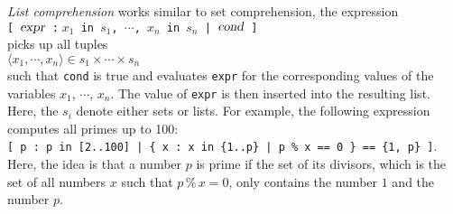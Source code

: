 \emph{List comprehension} works similar to set comprehension, the expression
\\[0.2cm]
\hspace*{1.3cm}
\texttt{[ $\textsl{expr}$ :$\;x_1$ in $s_1$, $\cdots$, $x_n$ in $s_n$ | $\textsl{cond}$ ]}
\\[0.2cm]
 picks up all tuples 
\\[0.2cm]
\hspace*{1.3cm}
$\langle x_1, \cdots, x_n \rangle \in s_1 \times \cdots \times s_n$
\\[0.2cm]
such that \texttt{cond} is true and evaluates \texttt{expr} for the corresponding values of the
variables $x_1$, $\cdots$, $x_n$.  The value of \texttt{expr} is
then inserted into the resulting list.  Here, the $s_i$ denote either sets or lists.
For example, the following expression  computes all primes up
to 100: 
\\[0.2cm]
\hspace*{1.3cm}
\texttt{[ p : p in [2..100] | \{ x : x in \{1..p\} | p \% x == 0 \} == \{1, p\} ]}.
\\[0.2cm]
Here, the idea is that a number $p$ is prime if the set of its divisors, which is the set
of all numbers $x$ such that $p \,\texttt{\%}\, x = 0$, only contains the number $1$ and
the number $p$. 

